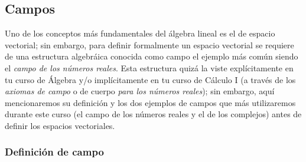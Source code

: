 \documentclass[12pt,dvipsnames]{article}
\begin{document}
\subsection{Campos} \label{Subsec:Campos}
Uno de los conceptos más fundamentales del álgebra lineal es el de espacio vectorial; sin embargo, para definir formalmente un espacio vectorial se requiere de una estructura algebráica conocida como campo \textemdash el ejemplo más común siendo el \emph{campo de los números reales}. Esta estructura quizá la viste explícitamente en tu curso de Álgebra y/o implícitamente en tu curso de Cálculo I (a través de los \textit{axiomas de campo} \textemdash o de cuerpo\textemdash\hspace{1.5mm} \textit{para los números reales}); sin embargo, aquí mencionaremos su definición y los dos ejemplos de campos que más utilizaremos durante este curso (el campo de los números reales y el de los complejos) antes de definir los espacios vectoriales.

\subsubsection{Definición de campo} \label{Def:Campo}
\end{document}
